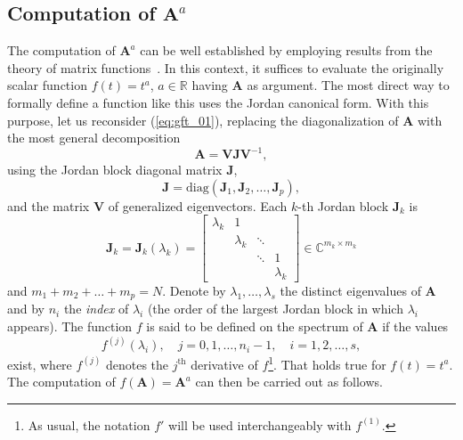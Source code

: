 \subsection{Computation of $\mathbf{A}^{{a}}$}\label{subsec:comp}
The computation of $\mathbf{A}^a$ can be well established by employing results from the theory of matrix functions~\parencite{higham2008functions}. In this context, it suffices to evaluate the originally scalar function $f(t)=t^a$, $a\in\mathbb{R}$ having $\mathbf{A}$ as argument. The most direct way to formally define a function like this uses the Jordan canonical form. With this purpose, let us reconsider (\ref{eq:gft_01}), replacing the diagonalization of $\mathbf{A}$ with the most general decomposition
\begin{equation}
    \label{eq:Ajordan}
    \mathbf{A} = \mathbf{V} \mathbf{J} \mathbf{V}^{-1},
\end{equation}
using the Jordan block diagonal matrix $\mathbf{J}$,
\begin{equation}\label{eq:jcf}
    \mathbf{J}=\mathrm{diag}(\mathbf{J}_1,\mathbf{J}_2,\ldots,\mathbf{J}_p),
\end{equation}
and the matrix $\mathbf{V}$ of generalized eigenvectors. Each $k$-th Jordan block $\mathbf{J}_k$ is
\begin{equation}
    \mathbf{J}_k=\mathbf{J}_k(\lambda_k)=\left[\begin{array}{cccc}
            \lambda_k & 1         &        &           \\
                      & \lambda_k & \ddots &           \\
                      &           & \ddots & 1         \\
                      &           &        & \lambda_k
        \end{array}\right]\in\mathbb{C}^{m_k\times m_k}
\end{equation}
and $m_1+m_2+\ldots +m_p=N$. Denote by $\lambda_1,\ldots,\lambda_s$ the distinct eigenvalues of $\mathbf{A}$ and by $n_i$ the \emph{index} of $\lambda_i$ (the order of the largest Jordan block in which $\lambda_i$ appears). The function $f$ is said to be defined on the spectrum of $\mathbf{A}$ if the values
\begin{equation}\label{eq:defspec}
    f^{(j)}(\lambda_i),\quad j=0,1,\ldots,n_i-1,\quad i=1,2,\ldots,s,
\end{equation}
exist, where $f^{(j)}$ denotes the $j^{\textrm{th}}$ derivative of $f$\footnote{As usual, the notation $f'$ will be used interchangeably with $f^{(1)}$.}. That holds true for $f(t)=t^a$. The computation of $f(\mathbf{A})=\mathbf{A}^a$ can then be carried out as follows.
